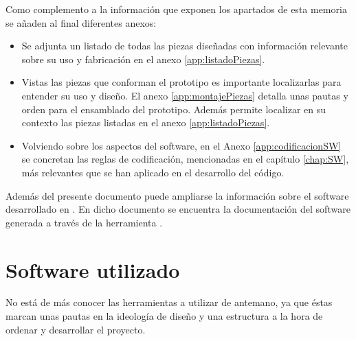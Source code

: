 Como complemento a la información que exponen los apartados de esta memoria se añaden al final diferentes anexos:

\begin{itemize}
    \item Se adjunta un listado de todas las piezas diseñadas con información relevante sobre su uso y fabricación en el anexo \ref{app:listadoPiezas}.
    \item Vistas las piezas que conforman el prototipo es importante localizarlas para entender su uso y diseño. El anexo \ref{app:montajePiezas} detalla unas pautas y orden para el ensamblado del prototipo. Además permite localizar en su contexto las piezas listadas en el anexo \ref{app:listadoPiezas}.
    \item Volviendo sobre los aspectos del software, en el Anexo \ref{app:codificacionSW} se concretan las reglas de codificación, mencionadas en el capítulo \ref{chap:SW}, más relevantes que se han aplicado en el desarrollo del código.
\end{itemize}

Además del presente documento puede ampliarse la información sobre el software desarrollado en \cite{rha_doc}. En dicho documento se encuentra la documentación del software generada a través de la herramienta .

\section{Software utilizado}

No está de más conocer las herramientas a utilizar de antemano, ya que éstas marcan unas pautas en la ideología de diseño y una estructura a la hora de ordenar y desarrollar el proyecto.

